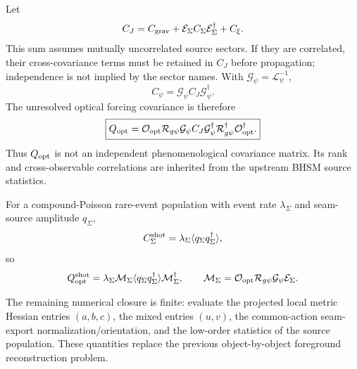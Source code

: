Let
\begin{equation}
C_J
=
C_{\rm grav}
+
\mathcal E_\Sigma C_\Sigma\mathcal E_\Sigma^\dagger
+
C_\xi.
\end{equation}
This sum assumes mutually uncorrelated source sectors. If they are
correlated, their cross-covariance terms must be retained in $C_J$ before
propagation; independence is not implied by the sector names.
With $\mathcal G_\psi=\mathcal L_\psi^{-1}$,
\begin{equation}
C_\psi
=
\mathcal G_\psi C_J\mathcal G_\psi^\dagger.
\end{equation}
The unresolved optical forcing covariance is therefore
\begin{equation}
\boxed{
Q_{\rm opt}
=
\mathcal O_{\rm opt}
\mathcal R_{g\psi}
\mathcal G_\psi
C_J
\mathcal G_\psi^\dagger
\mathcal R_{g\psi}^\dagger
\mathcal O_{\rm opt}^\dagger.
}
\label{eq:qopt-pullback}
\end{equation}
Thus $Q_{\rm opt}$ is not an independent phenomenological covariance matrix.
Its rank and cross-observable correlations are inherited from the upstream
BHSM source statistics.

For a compound-Poisson rare-event population with event rate
$\lambda_\Sigma$ and seam-source amplitude $q_\Sigma$,
\begin{equation}
C_\Sigma^{\rm shot}
=
\lambda_\Sigma
\langle q_\Sigma q_\Sigma^\dagger\rangle,
\end{equation}
so
\begin{equation}
Q_{\rm opt}^{\rm shot}
=
\lambda_\Sigma
\mathcal M_\Sigma
\langle q_\Sigma q_\Sigma^\dagger\rangle
\mathcal M_\Sigma^\dagger,
\qquad
\mathcal M_\Sigma
=
\mathcal O_{\rm opt}
\mathcal R_{g\psi}
\mathcal G_\psi
\mathcal E_\Sigma.
\end{equation}

The remaining numerical closure is finite: evaluate the projected local
metric Hessian entries $(a,b,c)$, the mixed entries $(u,v)$, the
common-action seam-export normalization/orientation, and the low-order
statistics of the source population.  These quantities replace the previous
object-by-object foreground reconstruction problem.
